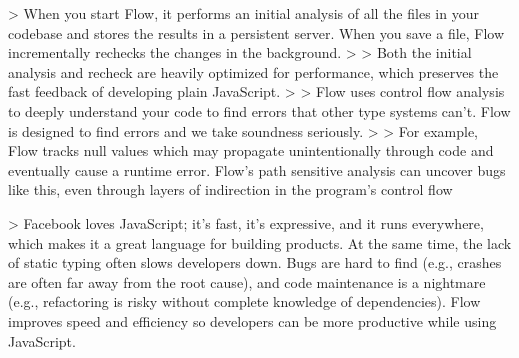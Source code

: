 
  > When you start Flow, it performs an initial analysis of all the files in your codebase and stores the results in a persistent server. When you save a file, Flow incrementally rechecks the changes in the background.
  >
  > Both the initial analysis and recheck are heavily optimized for performance, which preserves the fast feedback of developing plain JavaScript.
  >
  > Flow uses control flow analysis to deeply understand your code to find errors that other type systems can't. Flow is designed to find errors and we take soundness seriously.
  >
  > For example, Flow tracks null values which may propagate unintentionally through code and eventually cause a runtime error. Flow's path sensitive analysis can uncover bugs like this, even through layers of indirection in the program's control flow


  > Facebook loves JavaScript; it’s fast, it’s expressive, and it runs everywhere, which makes it a great language for building products. At the same time, the lack of static typing often slows developers down. Bugs are hard to find (e.g., crashes are often far away from the root cause), and code maintenance is a nightmare (e.g., refactoring is risky without complete knowledge of dependencies). Flow improves speed and efficiency so developers can be more productive while using JavaScript.

